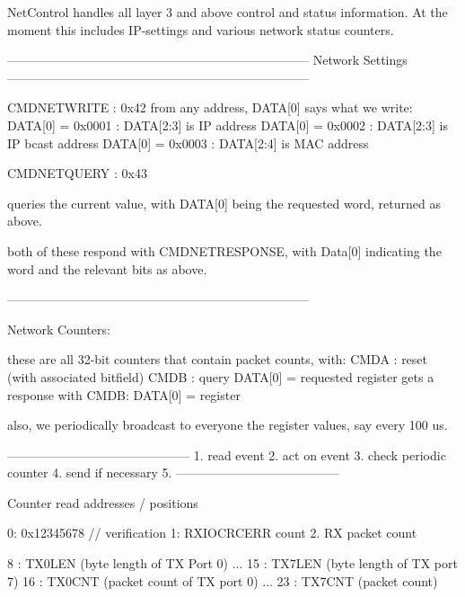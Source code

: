 NetControl handles all layer 3 and above control and status
information. At the moment this includes IP-settings and various
network status counters.

------------------------------------------------------------------------
Network Settings
------------------------------------------------------------------------

CMDNETWRITE : 0x42
from any address, DATA[0] says what we write:
    DATA[0] = 0x0001 : DATA[2:3] is IP address
    DATA[0] = 0x0002 : DATA[2:3] is IP bcast address
    DATA[0] = 0x0003 : DATA[2:4] is MAC address

CMDNETQUERY : 0x43

queries the current value, with DATA[0] being the requested word,
returned as above.

both of these respond with CMDNETRESPONSE, with Data[0] indicating
the word and the relevant bits as above. 

------------------------------------------------------------------------

Network Counters:

these are all 32-bit counters that contain packet counts, with: 
CMDA : reset (with associated bitfield)
CMDB : query DATA[0] = requested register
   gets a response with 
   CMDB: DATA[0] = register

   also, we periodically broadcast to everyone the register values,
   say every 100 us.


--------------------------------------------
1. read event
2. act on event
3. check periodic counter
4. send if necessary
5. 
---------------------------------------

Counter read addresses / positions

0: 0x12345678 // verification
1: RXIOCRCERR count
2. RX packet count

8 : TX0LEN (byte length of TX Port 0)
...
15 : TX7LEN (byte length of TX port 7)
16 : TX0CNT (packet count of TX port 0)
...
23 : TX7CNT (packet count)
